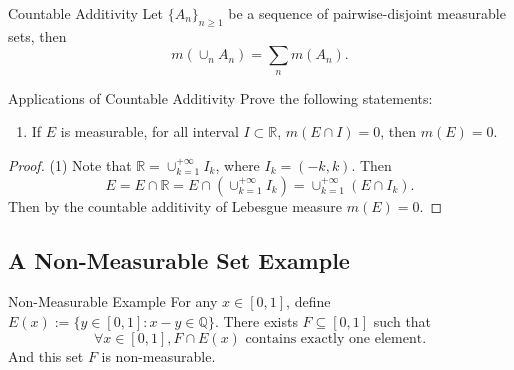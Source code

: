 \begin{theorem}{Countable Additivity}{}
  Let $\{A_n\}_{n \geq 1}$ be a sequence of pairwise-disjoint measurable sets, then
  \begin{equation}
    m(\cup _n A_n) = \sum\limits_n m(A_n).
  \end{equation}
\end{theorem}

\begin{example}{Applications of Countable Additivity}{}
  Prove the following statements:
  \begin{enumerate}
  \item If $E$ is measurable, for all interval $I \subset \mathbb{R}$, $m(E \cap I) = 0$,
    then $m(E) = 0$.
  \end{enumerate}
\end{example}

\begin{proof}
  (1) Note that $\mathbb{R} = \cup _{k = 1}^{+\infty} I_k$, where $I_k = (-k, k)$.
  Then
  \begin{equation}
    E = E \cap \mathbb{R} = E \cap (\cup _{k = 1}^{+\infty} I_k) = \cup _{k = 1}^{+\infty} (E \cap I_k).
  \end{equation}
  Then by the countable additivity of Lebesgue measure $m(E) = 0$.
\end{proof}

\subsection{A Non-Measurable Set Example}

\begin{example}{Non-Measurable Example}{}
  For any $x \in [0, 1]$, define $E(x) := \{y \in [0, 1]: x - y \in \mathbb{Q}\}$.
  There exists $F \subseteq [0, 1]$ such that
  \begin{equation}
    \forall x \in [0, 1], F \cap E(x) \text{ contains exactly one element}.
  \end{equation}
  And this set $F$ is non-measurable.
\end{example}

